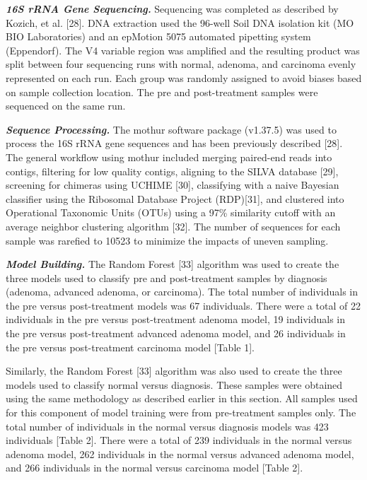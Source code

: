 \documentclass[12pt,]{article}
\begin{document}
\textbf{\emph{16S rRNA Gene Sequencing.}} Sequencing was completed as
described by Kozich, et al. {[}28{]}. DNA extraction used the 96-well
Soil DNA isolation kit (MO BIO Laboratories) and an epMotion 5075
automated pipetting system (Eppendorf). The V4 variable region was
amplified and the resulting product was split between four sequencing
runs with normal, adenoma, and carcinoma evenly represented on each run.
Each group was randomly assigned to avoid biases based on sample
collection location. The pre and post-treatment samples were sequenced
on the same run.

\textbf{\emph{Sequence Processing.}} The mothur software package
(v1.37.5) was used to process the 16S rRNA gene sequences and has been
previously described {[}28{]}. The general workflow using mothur
included merging paired-end reads into contigs, filtering for low
quality contigs, aligning to the SILVA database {[}29{]}, screening for
chimeras using UCHIME {[}30{]}, classifying with a naive Bayesian
classifier using the Ribosomal Database Project (RDP){[}31{]}, and
clustered into Operational Taxonomic Units (OTUs) using a 97\%
similarity cutoff with an average neighbor clustering algorithm
{[}32{]}. The number of sequences for each sample was rarefied to 10523
to minimize the impacts of uneven sampling.

\textbf{\emph{Model Building.}} The Random Forest {[}33{]} algorithm was
used to create the three models used to classify pre and post-treatment
samples by diagnosis (adenoma, advanced adenoma, or carcinoma). The
total number of individuals in the pre versus post-treatment models was
67 individuals. There were a total of 22 individuals in the pre versus
post-treatment adenoma model, 19 individuals in the pre versus
post-treatment advanced adenoma model, and 26 individuals in the pre
versus post-treatment carcinoma model {[}Table 1{]}.

Similarly, the Random Forest {[}33{]} algorithm was also used to create
the three models used to classify normal versus diagnosis. These samples
were obtained using the same methodology as described earlier in this
section. All samples used for this component of model training were from
pre-treatment samples only. The total number of individuals in the
normal versus diagnosis models was 423 individuals {[}Table 2{]}. There
were a total of 239 individuals in the normal versus adenoma model, 262
individuals in the normal versus advanced adenoma model, and 266
individuals in the normal versus carcinoma model {[}Table 2{]}.
\end{document}
